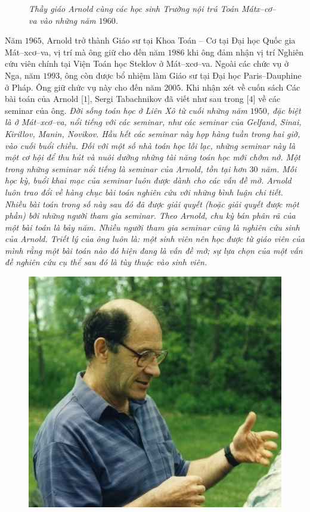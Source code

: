 \begin{multicols}{2}
\begin{figure}[H]
		\caption{\small\textit{\color{quantoan}Thầy giáo Arnold cùng các học sinh Trường nội trú Toán Mátx--cơ--va vào những năm $1960$.}}
		\vspace*{-10pt}
	\end{figure}
	Năm $1965$, Arnold trở thành Giáo sư tại Khoa Toán -- Cơ tại Đại học Quốc gia Mát--xcơ--va, vị trí mà ông giữ cho đến năm $1986$ khi ông đảm nhận vị trí Nghiên cứu viên chính tại Viện Toán học Steklov ở Mát--xcơ--va. Ngoài các chức vụ ở Nga, năm $1993$, ông còn được bổ nhiệm làm Giáo sư tại Đại học Paris--Dauphine ở Pháp. Ông giữ chức vụ này cho đến năm $2005$.
	\vskip 0.1cm
	Khi nhận xét về cuốn sách Các bài toán của Arnold [$1$], Sergi Tabachnikov đã viết như sau trong [$4$] về các seminar của ông.
	\vskip 0.1cm
	\textit{Đời sống toán học ở Liên Xô từ cuối những năm $1950$, đặc biệt là ở Mát--xcơ--va, nổi tiếng với các seminar, như các seminar của Gelfand, Sinai, Kirillov, Manin, Novikov. Hầu hết các seminar này họp hàng tuần trong hai giờ, vào cuối buổi chiều. Đối với một số nhà toán học lỗi lạc, những seminar này là một cơ hội để thu hút và nuôi dưỡng những tài năng toán học mới chớm nở. Một trong những seminar nổi tiếng  là seminar của Arnold, tồn tại hơn $30$ năm. Mỗi học kỳ, buổi khai mạc của seminar luôn được dành cho các vấn đề mở. Arnold luôn trao đổi về hàng chục bài toán nghiên cứu với những bình luận chi tiết. Nhiều bài toán trong số này sau đó đã được giải quyết (hoặc giải quyết được một phần) bởi những người tham gia seminar. Theo Arnold, chu kỳ bán phân  rã của một bài toán là bảy năm. Nhiều người tham gia seminar cũng là nghiên cứu sinh của Arnold. Triết lý của ông luôn là: một sinh viên nên học được từ giáo viên của mình rằng một bài toán nào đó hiện đang là vấn đề mở; sự lựa chọn của một vấn đề nghiên cứu cụ thể sau đó là tùy thuộc vào sinh viên.}
	\begin{figure}[H]
		\vspace*{-5pt}
		\centering
		\captionsetup{labelformat= empty, justification=centering}
		\includegraphics[width= 1\linewidth]{4}

\end{figure}
\end{multicols}
